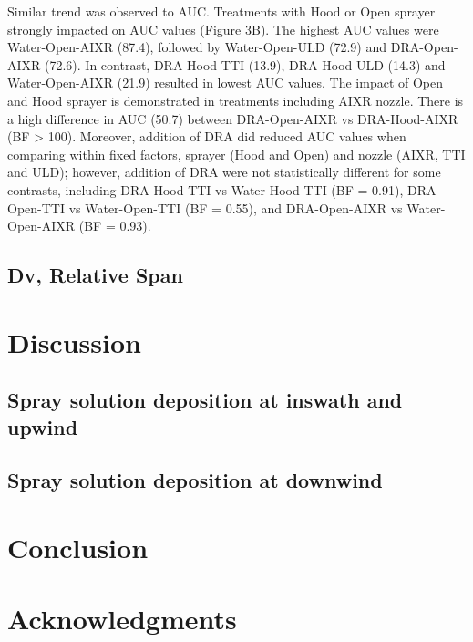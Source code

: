 \documentclass[
  12pt,
  a4paper,
]{article}
\begin{document}
Similar trend was observed to AUC. Treatments with Hood or Open sprayer
strongly impacted on AUC values (Figure 3B). The highest AUC values were
Water-Open-AIXR (87.4), followed by Water-Open-ULD (72.9) and
DRA-Open-AIXR (72.6). In contrast, DRA-Hood-TTI (13.9), DRA-Hood-ULD
(14.3) and Water-Open-AIXR (21.9) resulted in lowest AUC values. The
impact of Open and Hood sprayer is demonstrated in treatments including
AIXR nozzle. There is a high difference in AUC (50.7) between
DRA-Open-AIXR vs DRA-Hood-AIXR (BF \textgreater{} 100). Moreover,
addition of DRA did reduced AUC values when comparing within fixed
factors, sprayer (Hood and Open) and nozzle (AIXR, TTI and ULD);
however, addition of DRA were not statistically different for some
contrasts, including DRA-Hood-TTI vs Water-Hood-TTI (BF = 0.91),
DRA-Open-TTI vs Water-Open-TTI (BF = 0.55), and DRA-Open-AIXR vs
Water-Open-AIXR (BF = 0.93).

\hypertarget{dv-relative-span-1}{%
\subsection{Dv, Relative Span}\label{dv-relative-span-1}}

\hypertarget{discussion}{%
\section{Discussion}\label{discussion}}

\hypertarget{spray-solution-deposition-at-inswath-and-upwind-1}{%
\subsection{Spray solution deposition at inswath and
upwind}\label{spray-solution-deposition-at-inswath-and-upwind-1}}

\hypertarget{spray-solution-deposition-at-downwind-2}{%
\subsection{Spray solution deposition at
downwind}\label{spray-solution-deposition-at-downwind-2}}

\hypertarget{conclusion}{%
\section{Conclusion}\label{conclusion}}

\hypertarget{acknowledgments}{%
\section{Acknowledgments}\label{acknowledgments}}
\end{document}
